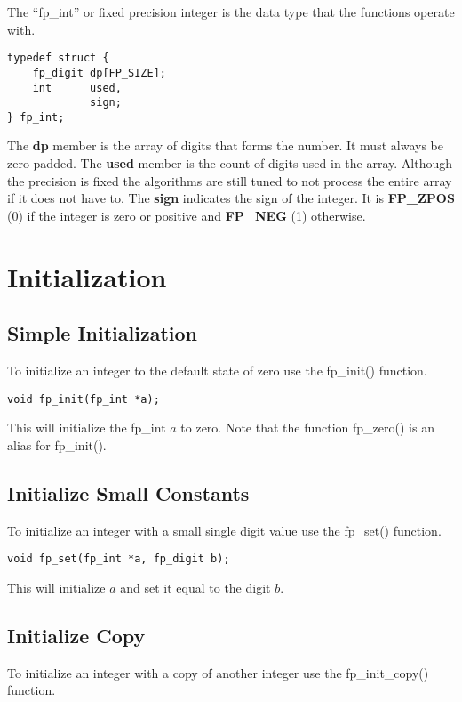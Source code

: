 \documentclass[b5paper]{book}
\begin{document}
The ``fp\_int'' or fixed precision integer is the data type that the functions operate with.  

\begin{verbatim}
typedef struct {
    fp_digit dp[FP_SIZE];
    int      used, 
             sign;
} fp_int;
\end{verbatim}

The \textbf{dp} member is the array of digits that forms the number.  It must always be zero 
padded.  The \textbf{used} member is the count of digits used in the array.  Although the 
precision is fixed the algorithms are still tuned to not process the entire array if it 
does not have to.  The \textbf{sign} indicates the sign of the integer.  It is \textbf{FP\_ZPOS} (0)
if the integer is zero or positive and \textbf{FP\_NEG} (1) otherwise.

\section{Initialization}
\subsection{Simple Initialization}
To initialize an integer to the default state of zero use the fp\_init() function.

\begin{verbatim}
void fp_init(fp_int *a);
\end{verbatim}

This will initialize the fp\_int $a$ to zero.  Note that the function fp\_zero() is an alias
for fp\_init().

\subsection{Initialize Small Constants}
To initialize an integer with a small single digit value use the fp\_set() function.

\begin{verbatim}
void fp_set(fp_int *a, fp_digit b);
\end{verbatim}

This will initialize $a$ and set it equal to the digit $b$.  

\subsection{Initialize Copy}
To initialize an integer with a copy of another integer use the fp\_init\_copy() function.
\end{document}
